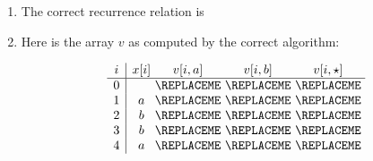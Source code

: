 \begin{enumerate}

\item[(c)] 

  The correct recurrence relation is   
  \BLUE{
    \[
      |V(i, u)| =
      \begin{cases}
        \REPLACEME
      \end{cases}
    \]
  }



\item[(d)]

  Here is the array $v$ as computed by the correct algorithm:

  \begin{blue}
    \[
    \begin{array}{c|c@{~}c@{~}c@{~}c@{~}}
      i & x[i] & v[i,a] & v[i,b] & v[i, \star] \\ \hline
      0    &      & \REPLACEME & \REPLACEME & \REPLACEME  \\
      1    &  a  & \REPLACEME & \REPLACEME & \REPLACEME \\
      2    &  b  & \REPLACEME & \REPLACEME & \REPLACEME \\
      3    &  b  & \REPLACEME & \REPLACEME & \REPLACEME \\
      4    &  a  & \REPLACEME & \REPLACEME & \REPLACEME
    \end{array}
  \]
\end{blue}


  
\end{enumerate}

